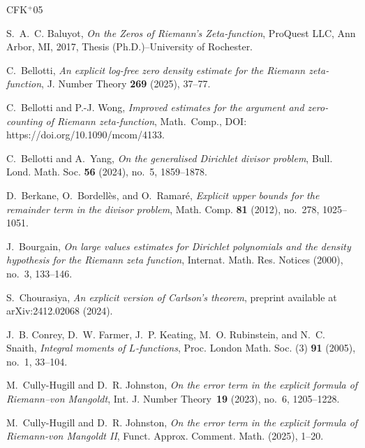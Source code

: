 \documentclass[a4paper,reqno]{amsart}
\theoremstyle{definition}
\begin{document}
\newcommand{\etalchar}[1]{$^{#1}$}
\providecommand{\bysame}{\leavevmode\hbox to3em{\hrulefill}\thinspace}
\providecommand{\MR}{\relax\ifhmode\unskip\space\fi MR }
\providecommand{\MRhref}[2]{%
  \href{http://www.ams.org/mathscinet-getitem?mr=#1}{#2}
}
\providecommand{\href}[2]{#2}
\begin{thebibliography}{CFK{\etalchar{+}}05}

S.~A.~C. Baluyot, \emph{On the {Z}eros of {R}iemann's {Z}eta-function}, ProQuest LLC, Ann Arbor, MI, 2017, Thesis (Ph.D.)--University of Rochester.

C.~Bellotti, \emph{An explicit log-free zero density estimate for the {R}iemann zeta-function}, J. Number Theory \textbf{269} (2025), 37--77.

C.~Bellotti and P.-J. Wong, \emph{Improved estimates for the argument and zero-counting of {R}iemann zeta-function}, Math.~Comp., DOI: https://doi.org/10.1090/mcom/4133.

C.~Bellotti and A.~Yang, \emph{On the generalised {D}irichlet divisor problem}, Bull. Lond. Math. Soc. \textbf{56} (2024), no.~5, 1859--1878.

D.~Berkane, O.~Bordell\`es, and O.~Ramar\'{e}, \emph{Explicit upper bounds for the remainder term in the divisor problem}, Math. Comp. \textbf{81} (2012), no.~278, 1025--1051.

J.~Bourgain, \emph{On large values estimates for {D}irichlet polynomials and the density hypothesis for the {R}iemann zeta function}, Internat. Math. Res. Notices (2000), no.~3, 133--146.

S.~Chourasiya, \emph{An explicit version of {C}arlson's theorem}, preprint available at arXiv:2412.02068 (2024).

\bibitem[CFK{\etalchar{+}}05]{ConreyMoments}
J.~B. Conrey, D.~W. Farmer, J.~P. Keating, M.~O. Rubinstein, and N.~C. Snaith, \emph{Integral moments of {$L$}-functions}, Proc. London Math. Soc. (3) \textbf{91} (2005), no.~1, 33--104.

M.~Cully-Hugill and D.~R. Johnston, \emph{On the error term in the explicit formula of {R}iemann--von {M}angoldt}, Int. J. Number Theory~\textbf{19} (2023), no.~6, 1205--1228.

M.~Cully-Hugill and D.~R. Johnston, \emph{On the error term in the explicit formula of {R}iemann-von {M}angoldt {II}}, Funct. Approx. Comment. Math. (2025), 1--20.


\end{thebibliography}
\end{document}
